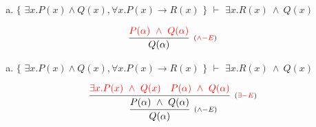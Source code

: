 \documentclass[aspectratio=43]{beamer}
\begin{document}
    \begin{frame}[fragile]
    
    	\begin{enumerate}[d)]
			\item $\{$ $\exists x.P(x)\land Q(x), \forall x.P(x)\to R(x)$ $\}$ $\vdash$ $\exists x.R(x)\ \land\ Q(x) $\\
		\end{enumerate}
        
        \vspace{70pt}
        
        \[
        \begin{array}{c}
		
        	\infer[_{(\textcolor{red}{\land -E})}] 
                	{Q(\alpha)}
                    {\textcolor{red}{P(\alpha)\ \land \ Q(\alpha)}}
		\end{array}
        \]
        
	\end{frame}
    
    \begin{frame}[fragile]
    
    	\begin{enumerate}[d)]
			\item $\{$ $\exists x.P(x)\land Q(x), \forall x.P(x)\to R(x)$ $\}$ $\vdash$ $\exists x.R(x)\ \land\ Q(x) $\\
		\end{enumerate}
        
        \vspace{80pt}
        
        \[
        \begin{array}{c}
		
        	\infer[_{(\land -E)}] 
                	{Q(\alpha)}
                    {\infer[_{(\textcolor{red}{\exists -E})}]
                    	{P(\alpha)\ \land \ Q(\alpha)}
                    	{\textcolor{red}{\exists x.P(x)\ \land \ Q(x)}
                        \hspace{10pt}
                        \textcolor{red}{P(\alpha)\ \land \ Q(\alpha)}
                        }
                    }
		\end{array}
        \]
        
	\end{frame}
    
\end{document}
